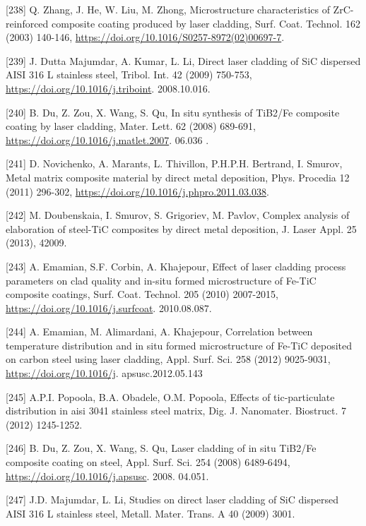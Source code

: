 \documentclass[10pt]{article}
\begin{document}
[238] Q. Zhang, J. He, W. Liu, M. Zhong, Microstructure characteristics of ZrC-reinforced composite coating produced by laser cladding, Surf. Coat. Technol. 162 (2003) 140-146, \href{https://doi.org/10.1016/S0257-8972(02)00697-7}{https://doi.org/10.1016/S0257-8972(02)00697-7}.

[239] J. Dutta Majumdar, A. Kumar, L. Li, Direct laser cladding of SiC dispersed AISI 316 L stainless steel, Tribol. Int. 42 (2009) 750-753, \href{https://doi.org/10.1016/j.triboint}{https://doi.org/10.1016/j.triboint}. 2008.10.016.

[240] B. Du, Z. Zou, X. Wang, S. Qu, In situ synthesis of TiB2/Fe composite coating by laser cladding, Mater. Lett. 62 (2008) 689-691, \href{https://doi.org/10.1016/j.matlet.2007}{https://doi.org/10.1016/j.matlet.2007}. 06.036 .

[241] D. Novichenko, A. Marants, L. Thivillon, P.H.P.H. Bertrand, I. Smurov, Metal matrix composite material by direct metal deposition, Phys. Procedia 12 (2011) 296-302, \href{https://doi.org/10.1016/j.phpro.2011.03.038}{https://doi.org/10.1016/j.phpro.2011.03.038}.

[242] M. Doubenskaia, I. Smurov, S. Grigoriev, M. Pavlov, Complex analysis of elaboration of steel-TiC composites by direct metal deposition, J. Laser Appl. 25 (2013), 42009.

[243] A. Emamian, S.F. Corbin, A. Khajepour, Effect of laser cladding process parameters on clad quality and in-situ formed microstructure of Fe-TiC composite coatings, Surf. Coat. Technol. 205 (2010) 2007-2015, \href{https://doi.org/10.1016/j.surfcoat}{https://doi.org/10.1016/j.surfcoat}. 2010.08.087.

[244] A. Emamian, M. Alimardani, A. Khajepour, Correlation between temperature distribution and in situ formed microstructure of Fe-TiC deposited on carbon steel using laser cladding, Appl. Surf. Sci. 258 (2012) 9025-9031, \href{https://doi.org/10.1016/j}{https://doi.org/10.1016/j}. apsusc.2012.05.143

[245] A.P.I. Popoola, B.A. Obadele, O.M. Popoola, Effects of tic-particulate distribution in aisi 3041 stainless steel matrix, Dig. J. Nanomater. Biostruct. 7 (2012) 1245-1252.

[246] B. Du, Z. Zou, X. Wang, S. Qu, Laser cladding of in situ TiB2/Fe composite coating on steel, Appl. Surf. Sci. 254 (2008) 6489-6494, \href{https://doi.org/10.1016/j.apsusc}{https://doi.org/10.1016/j.apsusc}. 2008. 04.051.

[247] J.D. Majumdar, L. Li, Studies on direct laser cladding of SiC dispersed AISI 316 L stainless steel, Metall. Mater. Trans. A 40 (2009) 3001.
\end{document}
